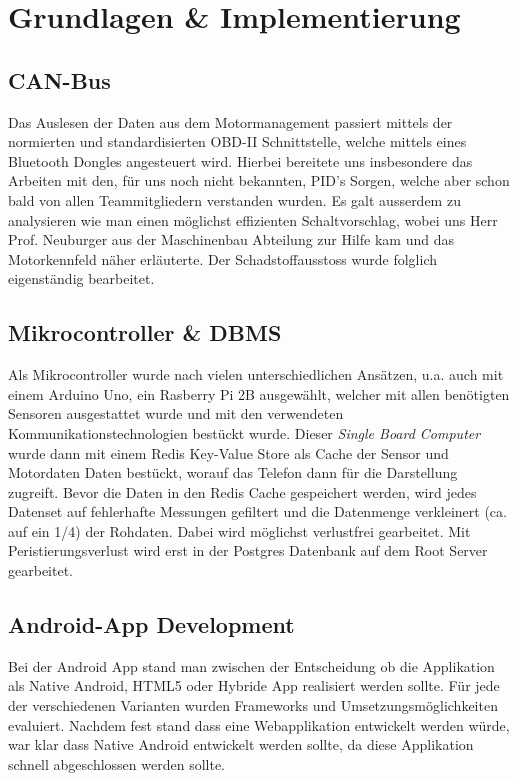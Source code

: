 \chapter{Grundlagen \& Implementierung}

\section{CAN-Bus}
Das Auslesen der Daten aus dem Motormanagement passiert mittels der normierten und standardisierten OBD-II Schnittstelle, welche mittels eines Bluetooth Dongles angesteuert wird. Hierbei bereitete uns insbesondere das Arbeiten mit den, für uns noch nicht bekannten, PID's Sorgen, welche aber schon bald von allen Teammitgliedern verstanden wurden. Es galt ausserdem zu analysieren wie man einen möglichst effizienten Schaltvorschlag, wobei uns Herr Prof. Neuburger aus der Maschinenbau Abteilung zur Hilfe kam und das Motorkennfeld näher erläuterte. Der Schadstoffausstoss wurde folglich eigenständig bearbeitet.
\section{Mikrocontroller \& DBMS}
Als Mikrocontroller wurde nach vielen unterschiedlichen Ansätzen, u.a. auch mit einem Arduino Uno, ein Rasberry Pi 2B ausgewählt, welcher mit allen benötigten Sensoren ausgestattet wurde und mit den verwendeten Kommunikationstechnologien bestückt wurde. Dieser \textit{Single Board Computer} wurde dann mit einem Redis Key-Value Store als Cache der Sensor und Motordaten Daten bestückt, worauf das Telefon dann für die Darstellung zugreift. Bevor die Daten in den Redis Cache gespeichert werden, wird jedes Datenset auf fehlerhafte Messungen gefiltert und die Datenmenge verkleinert (ca. auf ein 1/4) der Rohdaten. Dabei wird möglichst verlustfrei gearbeitet. Mit Peristierungsverlust wird erst in der Postgres Datenbank auf dem Root Server gearbeitet.

\newpage
\section{Android-App Development}
Bei der Android App stand man zwischen der Entscheidung ob die Applikation als Native Android, HTML5 oder Hybride App realisiert werden sollte. 
\newline
Für jede der verschiedenen Varianten wurden Frameworks und Umsetzungsmöglichkeiten evaluiert. Nachdem fest stand dass eine Webapplikation entwickelt werden würde, war klar dass Native Android entwickelt werden sollte, da diese Applikation schnell abgeschlossen werden sollte.

